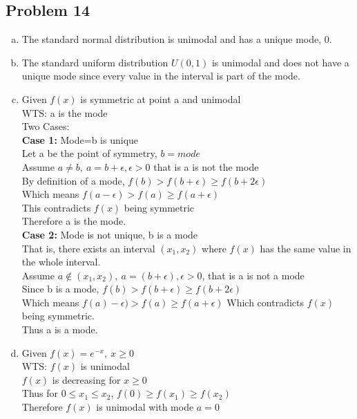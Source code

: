 \documentclass{article}
\begin{document}
\begin{flushleft}
\section*{Problem 14}
\begin{enumerate}[(a)]
\item
The standard normal distribution is unimodal and has a unique mode, 0. 
\item 
The standard uniform distribution $U(0,1)$ is unimodal and does not have a unique mode since every value in the interval is part of the mode.
\item 
Given $f(x)$ is symmetric at point a and unimodal\\
WTS: a is the mode\\
Two Cases:\\
\textbf{Case 1:} Mode=b is unique\\
Let a be the point of symmetry, $b=mode$\\
Assume $a\neq b, \ a=b+\epsilon, \epsilon>0$ that is a is not the mode\\
By definition of a mode, $f(b)>f(b+\epsilon)\geq f(b+2\epsilon)$\\
Which means $f(a-\epsilon)>f(a)\geq f(a+\epsilon)$\\
This contradicts $f(x)$ being symmetric\\
Therefore a is the mode.\\
\textbf{Case 2:} Mode is not unique, b is a mode\\
That is, there exists an interval $(x_1,x_2)$ where $f(x)$ has the same value in the whole interval.\\
Assume $a \notin (x_1,x_2), \ a=(b+\epsilon), \epsilon>0$, that is a is not a mode\\
Since b is a mode, $f(b)>f(b+\epsilon)\geq f(b+2\epsilon)$\\
Which means $f(a)-\epsilon)>f(a)\geq f(a+\epsilon)$
Which contradicts $f(x)$ being symmetric.\\
Thus a is a mode.
\item
Given $f(x)=e^{-x}, \ x\geq 0$\\
WTS: $f(x)$ is unimodal\\
$f(x)$ is decreasing for $x\geq 0$\\
Thus for $0\leq x_1 \leq x_2$, $f(0)\geq f(x_1)\geq f(x_2)$\\
Therefore $f(x)$ is unimodal with mode $a=0$
\end{enumerate}
\end{flushleft}
\end{document}
